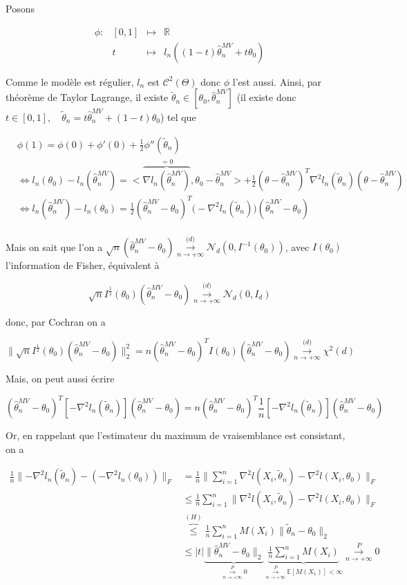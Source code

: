 \documentclass[12pt]{article}
\newcommand{\bb}[1]{\mathbb{#1}} %
\newcommand{\R}{\bb{R}} %
\newcommand{\somme}[2]{\sum\limits_{#1}^{#2}}
\renewcommand{\cal}{\mathcal}
\newcommand{\norme}[1]{\lVert #1 \rVert}
\newcommand{\chideux}[1]{\chi^2(#1)} %
\newcommand{\esp}[1]{\bb{ E} \mathopen{}\left[#1\right]} %
\newcommand{\EMV}{\widehat{\theta}_n^{MV}}
\newcommand{\1}{\bb{1}} %
\newcommand{\cvn}{\underset{n\rightarrow+\infty}{\longrightarrow}} %
\newcommand{\cvP}{\overset{P}{\cvn}} %
\newcommand{\cvl}{\overset{\mathcal (d)}{\cvn}} %
\begin{document}
{Posons

$$
\begin{array}{rrrl} %

  \phi :& [0,1] &\mapsto& \R\\
  & t & \mapsto &  l_n((1-t)\EMV+t\theta_0) \end{array}
$$

Comme le modèle est régulier, $l_n$ est $\cal C^2(\Theta)$ donc $\phi$ l'est aussi. Ainsi, par théorème de Taylor Lagrange, il existe $\widetilde \theta_n \in [\theta_0, \EMV]$ (il existe donc $t\in [0,1],\quad  \widetilde \theta_n = t\EMV+(1-t)\theta_0$)  tel que 

\begin{align*}
	&\phi(1) = \phi(0) + \phi'(0) + \frac 12 \phi''(\widetilde \theta_n) \\
	& \iff l_n(\theta_0)-l_n(\EMV) = <\overbrace{\nabla l_n(\EMV)}^{=0 }, \theta_0-\EMV> + \frac 12 (\theta-\EMV)^T\nabla^2l_n(\widetilde \theta_n)  (\theta-\EMV)\\
	&\iff l_n(\EMV) -  l_n(\theta_0) =  \frac 12 (\EMV-\theta_0)^T\big(-\nabla^2l_n(\widetilde \theta_n)\big)(\EMV-\theta_0) \\
\end{align*}

Mais on sait que l'on a $\sqrt n (\EMV-\theta_0) \cvl \cal N_d(0, I^{-1}(\theta_0))$, avec $I(\theta_0)$ l'information de Fisher, équivalent à 

$$\sqrt n I^{\frac 12}(\theta_0)(\EMV-\theta_0) \cvl \cal N_d(0, I_d)$$

donc, par Cochran on a 

$$\norme{\sqrt n I^{\frac 12}(\theta_0)(\EMV-\theta_0)}_2^2 = n(\EMV-\theta_0)^TI(\theta_0) (\EMV-\theta_0) \cvl \chideux{d} $$

Mais, on peut aussi écrire 

$$ (\EMV-\theta_0)^T[-\nabla^2l_n(\widetilde \theta_n)] (\EMV-\theta_0) = n(\EMV-\theta_0)^T\frac 1n [-\nabla^2l_n(\widetilde \theta_n)] (\EMV-\theta_0)$$

Or, en rappelant que l'estimateur du maximum de vraisemblance est consistant, on a

\begin{align*}
	\frac 1n \norme{-\nabla^2l_n(\widetilde \theta_n) - (-\nabla^2l_n(\theta_0))}_F &=  \frac 1n \norme{\somme{i=1}{n}\nabla^2l(X_i,\widetilde \theta_n) - \nabla^2l(X_i, \theta_0)}_F  \\
	&\le \frac 1n\somme{i=1}{n} \norme{\nabla^2l(X_i, \widetilde \theta_n) - \nabla^2l(X_i, \theta_0)}_F \\
	& \overbrace{\le}^{(H)} \frac 1n \somme{i=1}{n} M(X_i)\norme{\widetilde \theta_n-\theta_0}_2 \\
	&\le |t| \underbrace{\norme{\EMV-\theta_0}_2}_{\cvP 0} \underbrace{\frac 1n \somme{i=1}{n} M(X_i)}_{\cvP \esp{M(X_1)} < \infty} \cvP 0\\
\end{align*}

}
\end{document}
